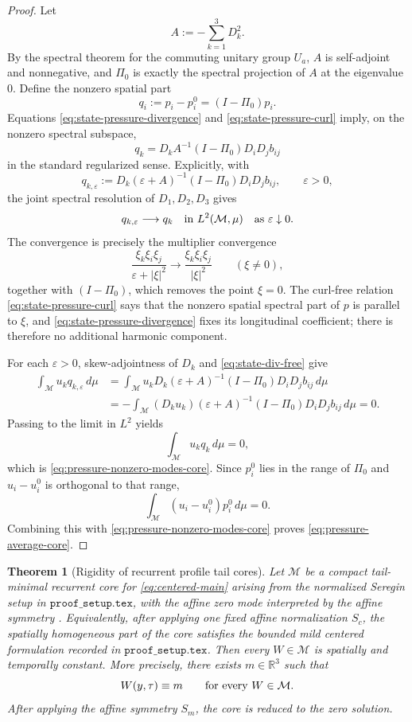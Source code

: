 \documentclass[11pt]{amsart}
\numberwithin{equation}{section}
\theoremstyle{plain}
\newtheorem{theorem}{Theorem}[section]
\theoremstyle{definition}
\theoremstyle{remark}
\newcommand{\R}{\mathbb R}
\newcommand{\calM}{\mathcal M}
\begin{document}
\begin{proof}
Let
\[
   A:=-\sum_{k=1}^3D_k^2.
\]
By the spectral theorem for the commuting unitary group \(U_a\), \(A\) is
self-adjoint and nonnegative, and \(\Pi_0\) is exactly the spectral projection
of \(A\) at the eigenvalue \(0\).  Define the nonzero spatial part
\[
   q_i:=p_i-p_i^0=(I-\Pi_0)p_i .
\]
Equations \eqref{eq:state-pressure-divergence} and
\eqref{eq:state-pressure-curl} imply, on the nonzero spectral subspace,
\[
   q_k
   =
   D_kA^{-1}(I-\Pi_0)D_iD_jb_{ij}
\]
in the standard regularized sense.  Explicitly, with
\[
   q_{k,\varepsilon}
   :=
   D_k(\varepsilon+A)^{-1}(I-\Pi_0)D_iD_jb_{ij},
   \qquad \varepsilon>0,
\]
the joint spectral resolution of \(D_1,D_2,D_3\) gives
\[
   q_{k,\varepsilon}\longrightarrow q_k
   \quad\hbox{in }L^2(\calM,\mu)
   \quad\hbox{as }\varepsilon\downarrow0.
\]
The convergence is precisely the multiplier convergence
\[
   \frac{\xi_k\xi_i\xi_j}{\varepsilon+|\xi|^2}
      \longrightarrow
   \frac{\xi_k\xi_i\xi_j}{|\xi|^2}
   \qquad (\xi\ne0),
\]
together with \((I-\Pi_0)\), which removes the point \(\xi=0\).  The
curl-free relation \eqref{eq:state-pressure-curl} says that the nonzero
spatial spectral part of \(p\) is parallel to \(\xi\), and
\eqref{eq:state-pressure-divergence} fixes its longitudinal coefficient;
there is therefore no additional harmonic component.

For each \(\varepsilon>0\), skew-adjointness of \(D_k\) and
\eqref{eq:state-div-free} give
\begin{align*}
   \int_{\calM}u_k q_{k,\varepsilon}\,d\mu
   &=
   \int_{\calM}
      u_kD_k(\varepsilon+A)^{-1}(I-\Pi_0)D_iD_jb_{ij}\,d\mu \\
   &=
   -\int_{\calM}
      (D_ku_k)(\varepsilon+A)^{-1}(I-\Pi_0)D_iD_jb_{ij}\,d\mu
   =0 .
\end{align*}
Passing to the limit in \(L^2\) yields
\[
   \int_{\calM}u_k q_k\,d\mu=0,
\]
which is \eqref{eq:pressure-nonzero-modes-core}.  Since \(p_i^0\) lies in the
range of \(\Pi_0\) and \(u_i-u_i^0\) is orthogonal to that range,
\[
   \int_{\calM}(u_i-u_i^0)p_i^0\,d\mu=0 .
\]
Combining this with \eqref{eq:pressure-nonzero-modes-core} proves
\eqref{eq:pressure-average-core}.
\end{proof}

\begin{theorem}[Rigidity of recurrent profile tail cores]
\label{thm:recurrent-tail-core-rigidity}
Let \(\calM\) be a compact tail-minimal recurrent core for
\eqref{eq:centered-main} arising from the normalized Seregin setup in
\(\texttt{proof\_setup.tex}\),
with the affine zero mode interpreted by the affine symmetry
.  Equivalently, after applying one fixed affine
normalization \(S_c\), the spatially homogeneous part of the core satisfies the
bounded mild centered formulation recorded in
\(\texttt{proof\_setup.tex}\).  Then
every \(W\in\calM\) is spatially and temporally constant.
More precisely, there exists \(m\in\R^3\) such that
\[
   W(y,\tau)\equiv m
   \qquad
   \hbox{for every }W\in\calM.
\]
After applying the affine symmetry \(S_m\), the core is reduced to the zero
solution.
\end{theorem}
\end{document}
